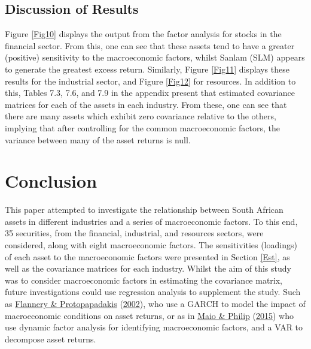 \documentclass[11pt,preprint, authoryear]{elsarticle}
\numberwithin{equation}{section}
\numberwithin{figure}{section}
\numberwithin{table}{section}
\begin{document}
\hypertarget{discussion-of-results}{%
\subsection{\texorpdfstring{Discussion of Results
\label{Disc}}{Discussion of Results }}\label{discussion-of-results}}

Figure \ref{Fig10} displays the output from the factor analysis for
stocks in the financial sector. From this, one can see that these assets
tend to have a greater (positive) sensitivity to the macroeconomic
factors, whilst Sanlam (SLM) appears to generate the greatest excess
return. Similarly, Figure \ref{Fig11} displays these results for the
industrial sector, and Figure \ref{Fig12} for resources. In addition to
this, Tables 7.3, 7.6, and 7.9 in the appendix present that estimated
covariance matrices for each of the assets in each industry. From these,
one can see that there are many assets which exhibit zero covariance
relative to the others, implying that after controlling for the common
macroeconomic factors, the variance between many of the asset returns is
null.

\hypertarget{conclusion}{%
\section{\texorpdfstring{Conclusion
\label{Conc}}{Conclusion }}\label{conclusion}}

This paper attempted to investigate the relationship between South
African assets in different industries and a series of macroeconomic
factors. To this end, 35 securities, from the financial, industrial, and
resources sectors, were considered, along with eight macroeconomic
factors. The sensitivities (loadings) of each asset to the macroeconomic
factors were presented in Section \ref{Est}, as well as the covariance
matrices for each industry. Whilst the aim of this study was to consider
macroeconomic factors in estimating the covariance matrix, future
investigations could use regression analysis to supplement the study.
Such as \protect\hyperlink{ref-Flannery}{Flannery \& Protopapadakis}
(\protect\hyperlink{ref-Flannery}{2002}), who use a GARCH to model the
impact of macroeconomic conditions on asset returns, or as in
\protect\hyperlink{ref-Maio2015}{Maio \& Philip}
(\protect\hyperlink{ref-Maio2015}{2015}) who use dynamic factor analysis
for identifying macroeconomic factors, and a VAR to decompose asset
returns.

\newpage
\end{document}
